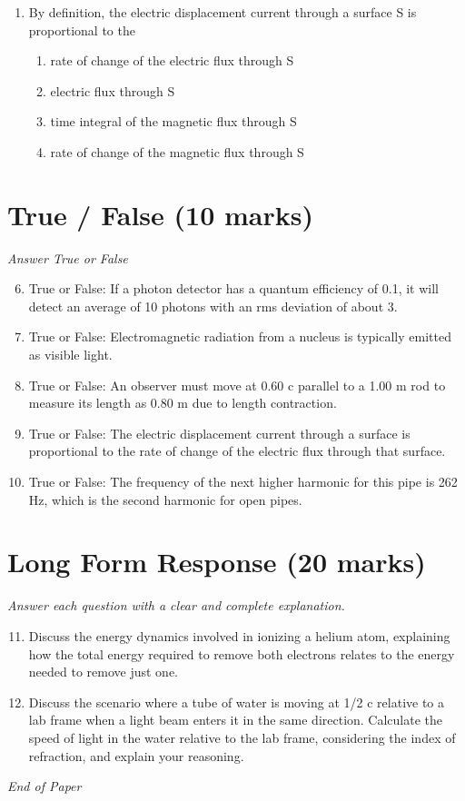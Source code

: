 \documentclass[12pt]{article}
\begin{document}
\begin{enumerate}[label=\arabic*.]
\begin{enumerate}[label=(\alph*)]
    \item kT
    \item (3/2) k T
    \item 3 kT
\end{enumerate}
\item By definition, the electric displacement current through a surface S is proportional to the
\begin{enumerate}[label=(\alph*)]
    \item rate of change of the electric flux through S
    \item electric flux through S
    \item time integral of the magnetic flux through S
    \item rate of change of the magnetic flux through S
\end{enumerate}
\end{enumerate}

\section*{True / False (10 marks)}
\textit{Answer True or False}
\begin{enumerate}[label=\arabic*.]
\setcounter{enumi}{5}
\item True or False: If a photon detector has a quantum efficiency of 0.1, it will detect an average of 10 photons with an rms deviation of about 3.
\item True or False: Electromagnetic radiation from a nucleus is typically emitted as visible light.
\item True or False: An observer must move at 0.60 c parallel to a 1.00 m rod to measure its length as 0.80 m due to length contraction.
\item True or False: The electric displacement current through a surface is proportional to the rate of change of the electric flux through that surface.
\item True or False: The frequency of the next higher harmonic for this pipe is 262 Hz, which is the second harmonic for open pipes.
\end{enumerate}

\section*{Long Form Response (20 marks)}
\textit{Answer each question with a clear and complete explanation.}
\begin{enumerate}[label=\arabic*.]
\setcounter{enumi}{10}
\item Discuss the energy dynamics involved in ionizing a helium atom, explaining how the total energy required to remove both electrons relates to the energy needed to remove just one.
\item Discuss the scenario where a tube of water is moving at 1/2 c relative to a lab frame when a light beam enters it in the same direction. Calculate the speed of light in the water relative to the lab frame, considering the index of refraction, and explain your reasoning.
\end{enumerate}

\vfill
\noindent\textit{End of Paper}
\end{document}

